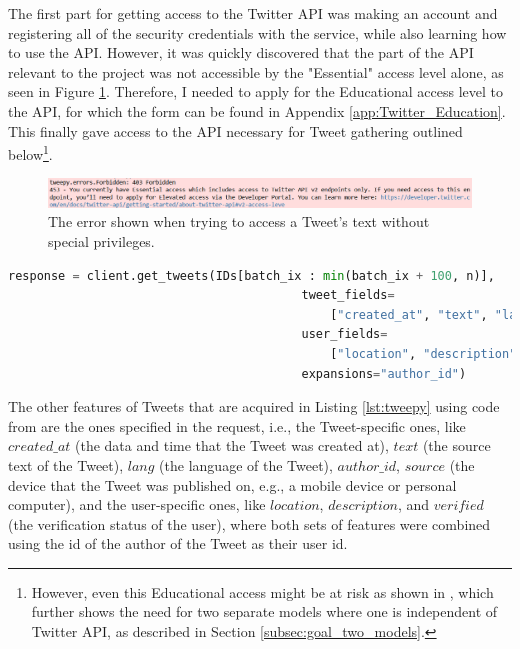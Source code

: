 \documentclass{l4proj}
\begin{document}
The first part for getting access to the Twitter API was making an account and registering all of the security credentials with the service, while also learning how to use the API. However, it was quickly discovered that the part of the API relevant to the project was not accessible by the "Essential" access level alone, as seen in Figure \ref{fig:Twitter_API_Forbidden}. Therefore, I needed to apply for the Educational access level to the API, for which the form can be found in Appendix \ref{app:Twitter_Education}. This finally gave access to the API necessary for Tweet gathering outlined below\footnote{However, even this Educational access might be at risk as shown in \citet{TwitterAPIFree}, which further shows the need for two separate models where one is independent of Twitter API, as described in Section \ref{subsec:goal_two_models}.}.

\begin{figure}
    \centering
    \includegraphics[width=0.8\linewidth]{images/Twitter API Forbidden.png}    

    \caption{The error shown when trying to access a Tweet's text without special privileges.}
    \label{fig:Twitter_API_Forbidden} 
\end{figure}

\begin{lstlisting}[language=python, float, caption={Using the Python {\normalfont tweepy} library to get Tweet features from both the Tweet and the author.}, label=lst:tweepy]
    response = client.get_tweets(IDs[batch_ix : min(batch_ix + 100, n)], 
                                         tweet_fields=
                                             ["created_at", "text", "lang", "author_id", "source"],
                                         user_fields=
                                             ["location", "description", "verified"],
                                         expansions="author_id")

\end{lstlisting}

The other features of Tweets that are acquired in Listing \ref{lst:tweepy} using code from \citet{TweepyTutorial} are the ones specified in the request, i.e., the Tweet-specific ones, like $created\_at$ (the data and time that the Tweet was created at), $text$ (the source text of the Tweet), $lang$ (the language of the Tweet), $author\_id$, $source$ (the device that the Tweet was published on, e.g., a mobile device or personal computer), and the user-specific ones, like $location$, $description$, and $verified$ (the verification status of the user), where both sets of features were combined using the id of the author of the Tweet as their user id. 
\end{document}
